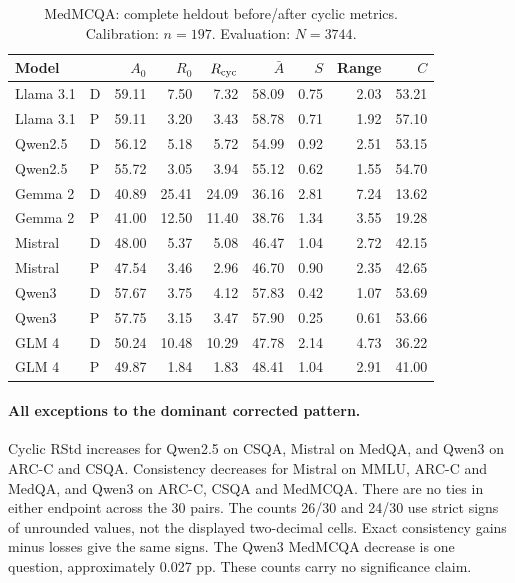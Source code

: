 \begin{table}[H]
\centering\small\setlength{\tabcolsep}{5pt}
\caption{MedMCQA: complete heldout before/after cyclic metrics. Calibration: $n=197$. Evaluation: $N=3744$.}\label{tab:corrected-medmcqa}
\begin{tabular}{llrrrrrrr}
\toprule
Model &  & $A_0$ & $R_0$ & $R_{\rm cyc}$ & $\bar A$ & $S$ & Range & $C$\\
\midrule
Llama 3.1 & D & 59.11 & 7.50 & 7.32 & 58.09 & 0.75 & 2.03 & 53.21\\
Llama 3.1 & P & 59.11 & 3.20 & 3.43 & 58.78 & 0.71 & 1.92 & 57.10\\
Qwen2.5 & D & 56.12 & 5.18 & 5.72 & 54.99 & 0.92 & 2.51 & 53.15\\
Qwen2.5 & P & 55.72 & 3.05 & 3.94 & 55.12 & 0.62 & 1.55 & 54.70\\
Gemma 2 & D & 40.89 & 25.41 & 24.09 & 36.16 & 2.81 & 7.24 & 13.62\\
Gemma 2 & P & 41.00 & 12.50 & 11.40 & 38.76 & 1.34 & 3.55 & 19.28\\
Mistral & D & 48.00 & 5.37 & 5.08 & 46.47 & 1.04 & 2.72 & 42.15\\
Mistral & P & 47.54 & 3.46 & 2.96 & 46.70 & 0.90 & 2.35 & 42.65\\
Qwen3 & D & 57.67 & 3.75 & 4.12 & 57.83 & 0.42 & 1.07 & 53.69\\
Qwen3 & P & 57.75 & 3.15 & 3.47 & 57.90 & 0.25 & 0.61 & 53.66\\
GLM 4 & D & 50.24 & 10.48 & 10.29 & 47.78 & 2.14 & 4.73 & 36.22\\
GLM 4 & P & 49.87 & 1.84 & 1.83 & 48.41 & 1.04 & 2.91 & 41.00\\
\bottomrule
\end{tabular}
\end{table}


\FloatBarrier\paragraph{All exceptions to the dominant corrected pattern.} Cyclic RStd increases for Qwen2.5 on CSQA, Mistral on MedQA, and Qwen3 on ARC-C and CSQA. Consistency decreases for Mistral on MMLU, ARC-C and MedQA, and Qwen3 on ARC-C, CSQA and MedMCQA. There are no ties in either endpoint across the 30 pairs. The counts 26/30 and 24/30 use strict signs of unrounded values, not the displayed two-decimal cells. Exact consistency gains minus losses give the same signs. The Qwen3 MedMCQA decrease is one question, approximately 0.027 pp. These counts carry no significance claim.

